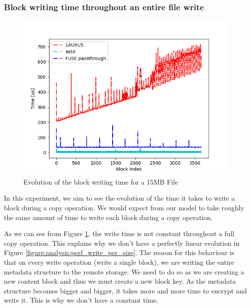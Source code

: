 \documentclass[../main.tex]{subfiles}
\begin{document}
\subsubsection{Block writing time throughout an entire file write}
\begin{figure}[h]
    \centering
    \includegraphics[width=\textwidth]{images/analysis/per_block}
    
    \caption{Evolution of the block writing time for a 15MB File}
    \label{figure:analysis:perf_time_per_block}
\end{figure}
\par In this experiment, we aim to see the evolution of the time it takes to write a block during a copy operation. We would expect from our model to take roughly the same amount of time to write each block during a copy operation.
\par As we can see from Figure \ref{figure:analysis:perf_time_per_block}, the write time is not constant throughout a full copy operation. This explains why we don't have a perfectly linear evolution in Figure \ref{figure:analysis:perf_write_per_size}. The reason for this behaviour is that on every write operation (write a single block), we are writing the entire metadata structure to the remote storage. We need to do so as we are creating a new content block and thus we must create a new block key. As the metadata structure becomes bigger and bigger, it takes more and more time to encrypt and write it. This is why we don't have a constant time.
\end{document}
